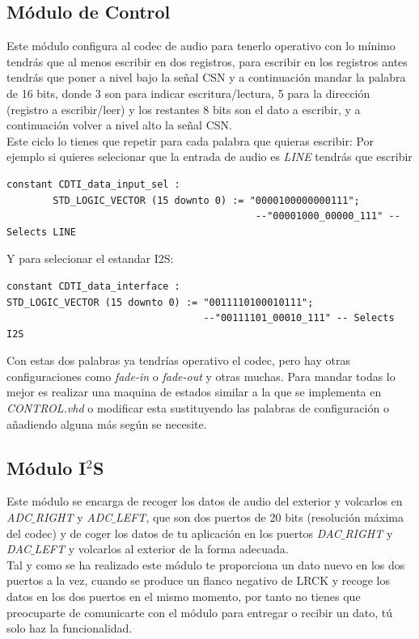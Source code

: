 	\subsection{Módulo de Control}
		Este módulo configura al codec de audio para tenerlo operativo con lo mínimo tendrás que al menos escribir en dos registros, para escribir en los registros antes tendrás que poner a nivel bajo la señal CSN y a continuación mandar la palabra de 16 bits, donde 3 son para indicar escritura/lectura, 5 para la dirección (registro a escribir/leer) y los restantes 8 bits son el dato a escribir, y a continuación volver a nivel alto la señal CSN. \\
		Este ciclo lo tienes que repetir para cada palabra que quieras escribir:
		Por ejemplo si quieres selecionar que la entrada de audio es \emph{LINE} tendrás que escribir
		\begin{verbatim}
constant CDTI_data_input_sel : 
		STD_LOGIC_VECTOR (15 downto 0) := "0000100000000111";	
						  			       --"00001000_00000_111" -- Selects LINE
\end{verbatim}
	Y para selecionar el estandar I2S:
	\begin{verbatim}
constant CDTI_data_interface : 
STD_LOGIC_VECTOR (15 downto 0) := "0011110100010111"; 
						          --"00111101_00010_111" -- Selects I2S
\end{verbatim}
	
	Con estas dos palabras ya tendrías operativo el codec, pero hay otras configuraciones como \emph{fade-in} o \emph{fade-out} y otras muchas. Para mandar todas lo mejor es realizar una maquina de estados similar a la que se implementa en \emph{CONTROL.vhd} o modificar esta sustituyendo las palabras de configuración o añadiendo alguna más según se necesite.

	
	\subsection{Módulo I$^2$S}
	Este módulo se encarga de recoger los datos de audio del exterior y volcarlos en \emph{ADC$\_$RIGHT} y \emph{ADC$\_$LEFT}, que son dos puertos de 20 bits (resolución máxima del codec)
	y de coger los datos de tu aplicación en los puertos  \emph{DAC$\_$RIGHT} y \emph{DAC$\_$LEFT} y volcarlos al exterior de la forma adecuada.\\
	
	Tal y como se ha realizado este módulo te proporciona un dato nuevo en los dos puertos a la vez, cuando se produce un flanco negativo de LRCK y recoge los datos en los dos puertos en el mismo momento, por tanto no tienes que preocuparte de comunicarte con el módulo para entregar o recibir un dato, tú solo haz la funcionalidad.\\
	
